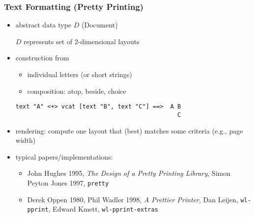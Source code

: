 
\begin{frame}[fragile]
\frametitle{Text Formatting (Pretty Printing)}

\begin{itemize}%
\item 
abstract data type $D$ (Document)

$D$ represents set of 2-dimensional layouts
\item
construction from
  \begin{itemize}[]
  \item individual letters (or short strings)
  \item composition: atop, beside, choice
  \end{itemize}
\begin{small}
\begin{verbatim}
text "A" <+> vcat [text "B", text "C"] ==>  A B
                                              C
\end{verbatim}
\end{small}
\item 
  rendering: compute one layout that (best) matches
  some criteria (e.g., page width)
\item
typical papers/implementations:
\begin{itemize}
\item 
John Hughes 1995, 
\emph{The Design of a Pretty Printing Library},
Simon Peyton Jones 1997, \texttt{pretty}
\item
Derek Oppen 1980, Phil Wadler 1998,
\emph{A Prettier Printer}, Dan Leijen, \texttt{wl-pprint},
Edward Kmett, \texttt{wl-pprint-extras}
\end{itemize}


\end{itemize}


\end{frame}

